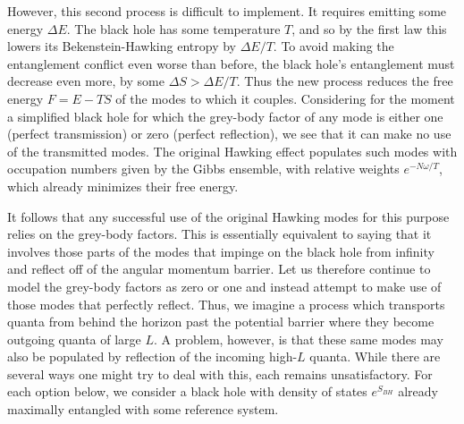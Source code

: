 \documentclass[12pt]{article}
\begin{document}
However, this second process is difficult to implement. It requires emitting some energy $\Delta E$.  The black hole has some temperature $T$, and so by the first law this lowers its Bekenstein-Hawking entropy by $\Delta E/T$.  To avoid making the entanglement conflict even worse than before, the black hole's entanglement must decrease even more, by some $\Delta S > \Delta E/T$. Thus the new process reduces the free energy $F = E-TS$ of the modes to which it couples.  Considering for the moment a simplified black hole for which the grey-body factor of any mode is either one (perfect transmission) or zero (perfect reflection), we see that it can make no use of the transmitted modes.  The original Hawking effect populates such modes with occupation numbers given by the Gibbs ensemble, with relative weights $e^{-N\omega/T}$, which already minimizes their free energy.


It follows that any successful use of the original Hawking modes for this purpose relies on the grey-body factors.  This is essentially equivalent to saying that it involves those parts of the modes that impinge on the black hole from infinity and reflect off of the angular momentum barrier.  Let us therefore continue to model the grey-body factors as zero or one and instead attempt to make use of those modes that perfectly reflect.
Thus, we imagine a process which transports quanta from behind the horizon past the potential barrier where they become outgoing quanta of large $L$.  A problem, however,  is that these same modes may also be populated by reflection of the incoming high-$L$ quanta.  While there are several ways one might try to deal with this, each remains unsatisfactory. For each option below, we consider a black hole with density of states $e^{S_{BH}}$ already maximally entangled with some reference system.
\end{document}
